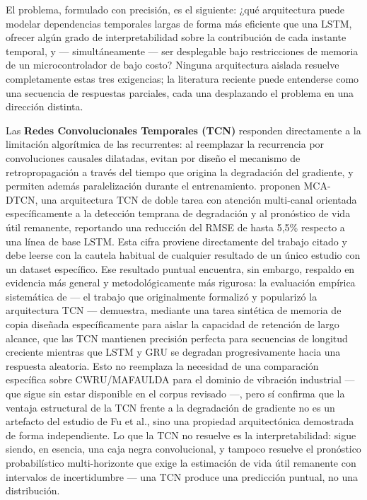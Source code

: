 \documentclass[11pt]{article}
\begin{document}
El problema, formulado con precisión, es el siguiente: ¿qué arquitectura puede modelar dependencias temporales largas de forma más eficiente que una LSTM, ofrecer algún grado de interpretabilidad sobre la contribución de cada instante temporal, y --- simultáneamente --- ser desplegable bajo restricciones de memoria de un microcontrolador de bajo costo? Ninguna arquitectura aislada resuelve completamente estas tres exigencias; la literatura reciente puede entenderse como una secuencia de respuestas parciales, cada una desplazando el problema en una dirección distinta.

Las \textbf{Redes Convolucionales Temporales (TCN)} responden directamente a la limitación algorítmica de las recurrentes: al reemplazar la recurrencia por convoluciones causales dilatadas, evitan por diseño el mecanismo de retropropagación a través del tiempo que origina la degradación del gradiente, y permiten además paralelización durante el entrenamiento. \citet{fu2024} proponen MCA-DTCN, una arquitectura TCN de doble tarea con atención multi-canal orientada específicamente a la detección temprana de degradación y al pronóstico de vida útil remanente, reportando una reducción del RMSE de hasta 5,5\% respecto a una línea de base LSTM. Esta cifra proviene directamente del trabajo citado y debe leerse con la cautela habitual de cualquier resultado de un único estudio con un dataset específico. Ese resultado puntual encuentra, sin embargo, respaldo en evidencia más general y metodológicamente más rigurosa: la evaluación empírica sistemática de \citet{bai2018tcn} --- el trabajo que originalmente formalizó y popularizó la arquitectura TCN --- demuestra, mediante una tarea sintética de memoria de copia diseñada específicamente para aislar la capacidad de retención de largo alcance, que las TCN mantienen precisión perfecta para secuencias de longitud creciente mientras que LSTM y GRU se degradan progresivamente hacia una respuesta aleatoria. Esto no reemplaza la necesidad de una comparación específica sobre CWRU/MAFAULDA para el dominio de vibración industrial --- que sigue sin estar disponible en el corpus revisado ---, pero sí confirma que la ventaja estructural de la TCN frente a la degradación de gradiente no es un artefacto del estudio de Fu et al., sino una propiedad arquitectónica demostrada de forma independiente. Lo que la TCN no resuelve es la interpretabilidad: sigue siendo, en esencia, una caja negra convolucional, y tampoco resuelve el pronóstico probabilístico multi-horizonte que exige la estimación de vida útil remanente con intervalos de incertidumbre --- una TCN produce una predicción puntual, no una distribución.
\end{document}
